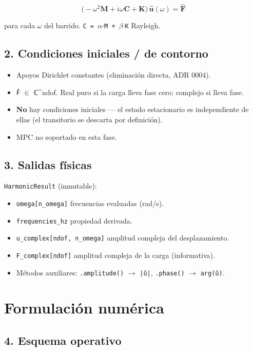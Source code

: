 \documentclass[11pt,letterpaper,oneside]{report}
\begin{document}
\[
\big(-\omega^2\mathbf{M} + i\omega\mathbf{C} + \mathbf{K}\big)\,\hat{\mathbf{u}}(\omega) = \hat{\mathbf{F}}
\]

para cada \texttt{\ensuremath{\omega}} del barrido. \texttt{C = \ensuremath{\alpha}\ensuremath{\cdot}M + \ensuremath{\beta}\ensuremath{\cdot}K} Rayleigh.

\subsection{2. Condiciones iniciales / de contorno}

\begin{itemize}
  \item Apoyos Dirichlet constantes (eliminación directa, ADR 0004).
  \item \texttt{F̂} \ensuremath{\in} ℂ\textasciicircum{}ndof. Real puro si la carga lleva fase cero; complejo si lleva fase.
  \item \textbf{No} hay condiciones iniciales --- el estado estacionario es independiente de ellas (el transitorio se descarta por definición).
  \item MPC no soportado en esta fase.
\end{itemize}

\subsection{3. Salidas físicas}

\texttt{HarmonicResult} (inmutable):

\begin{itemize}
  \item \texttt{omega[n\_omega]} frecuencias evaluadas (rad/s).
  \item \texttt{frequencies\_hz} propiedad derivada.
  \item \texttt{u\_complex[ndof, n\_omega]} amplitud compleja del desplazamiento.
  \item \texttt{F\_complex[ndof]} amplitud compleja de la carga (informativa).
  \item Métodos auxiliares: \texttt{.amplitude()} \ensuremath{\to} \texttt{|û|}, \texttt{.phase()} \ensuremath{\to} \texttt{arg(û)}.
\end{itemize}


\section{Formulación numérica}

\subsection{4. Esquema operativo}
\end{document}
